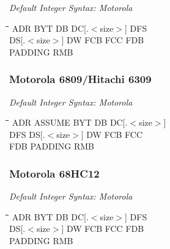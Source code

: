 {\em Default Integer Syntax: Motorola}

{\tt\begin{tabbing}
\hspace{3cm}\=\hspace{3cm}\=\hspace{3cm}\=\hspace{3cm}\=\kill
ADR        \> BYT         \> DB          \> DC[.$<$size$>$] \> DFS     \\
DS[.$<$size$>$] \> DW     \> FCB         \> FCC         \> FDB         \\
PADDING     \> RMB \\
\end{tabbing}}

\subsubsection{Motorola 6809/Hitachi 6309}

{\em Default Integer Syntax: Motorola}

{\tt\begin{tabbing}
\hspace{3cm}\=\hspace{3cm}\=\hspace{3cm}\=\hspace{3cm}\=\kill
ADR        \> ASSUME      \> BYT         \> DB          \> DC[.$<$size$>$] \\
DFS        \> DS[.$<$size$>$] \> DW      \> FCB         \> FCC \\
FDB        \> PADDING     \> RMB \\
\end{tabbing}}

\subsubsection{Motorola 68HC12}

{\em Default Integer Syntax: Motorola}

{\tt\begin{tabbing}
\hspace{3cm}\=\hspace{3cm}\=\hspace{3cm}\=\hspace{3cm}\=\kill
ADR        \> BYT         \> DB          \> DC[.$<$size$>$] \> DFS     \\
DS[.$<$size$>$] DW        \> FCB         \> FCC         \> FDB \\
PADDING     \> RMB \\
\end{tabbing}}

